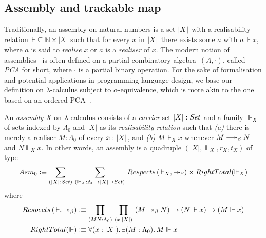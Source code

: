 \documentclass[a4paper,UKenglish,numberwithinsect,cleveref,thm-restate]{lipics-v2021}
\numberwithin{equation}{section}
\theoremstyle{definition}
\theoremstyle{plain}
\begin{document}
\subsection{Assembly and trackable map}
Traditionally, an assembly on natural numbers is a set $\mathopen{}\left|X\right|_{}^{}\mathclose{}$ with a realisability relation $\mathord{\Vdash} \subseteq \mathbb{N} \times |X|$ such that for every $x$ in $\mathopen{}\left|X\right|_{}^{}\mathclose{}$ there exists some $a$ with $a \Vdash x$, where $a$ is said to \emph{realise} $x$ or $a$ is a \emph{realiser} of $x$.
The modern notion of assemblies~\cite{Oosten2008} is often defined on a partial  combinatory algebra~$(A, \cdot)$, called \emph{PCA} for short, where $\cdot$ is a partial binary operation.
For the sake of formalisation and potential applications in programming language design, we base our definition on $\lambda$-calculus subject to $\alpha$-equivalence, which is more akin to the one based on an ordered PCA~\cite{Hofstra2003}. 

\begin{definition}\label{def:assembly}
  An \emph{assembly} $X$ on $\lambda$-calculus consists of a \emph{carrier} set $|X| : \set$ and a family ${\Vdash_X}$ of sets indexed by $\Lambda_0$ and $|X|$ as its \emph{realisability relation} such that
  \emph{(a)} there is merely a realiser $M : \Lambda_0$ of every $x : \mathopen{}\left|X\right|_{}^{}\mathclose{}$, and
  \emph{(b)} $M \Vdash_X x$ whenever $M \reduce N$ and $N \Vdash_X x$.
  In other words, an assembly is a quadruple $(|X|, \Vdash_X, r_X, t_X)$ of type
  \[
    \Asm_0 \defeq \sm{\bproj{X} : {\set}}{\mathord{\Vdash_X}:\Lambda_0 \to |X| \to \set} 
      \mathsf{Respects}\left(\Vdash_X, \mathord{\twoheadrightarrow_\beta}\right)
      \times \mathsf{RightTotal}({\Vdash_X})
  \]
  where
  \begin{align}
    \mathsf{Respects}\left(\mathord{\Vdash}, \mathord{\twoheadrightarrow_\beta}\right) & \defeq\prd{M N : \Lambda_0}{x : |X|} \left(M \twoheadrightarrow_ \beta N\right) \to \left(N \Vdash x\right) \to \left(M \Vdash x\right) \label{eq:respect-reduction} \\      
    \mathsf{RightTotal}(\Vdash) & \defeq \fall{x : |X|}\exis{M : \Lambda_0} M \Vdash x
    \label{eq:right-total}
  \end{align}
\end{definition}
\end{document}
